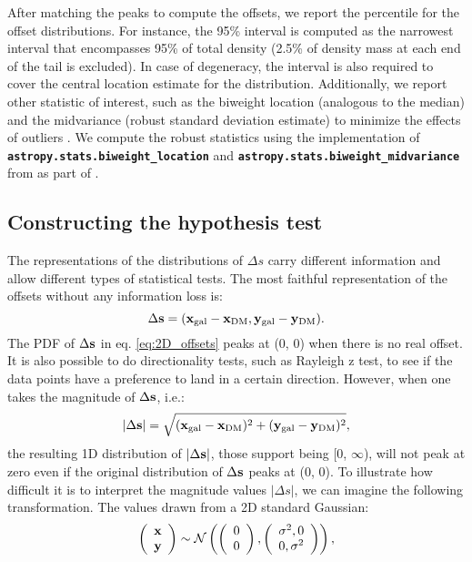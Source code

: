 After matching the peaks to compute the offsets, 
we report the percentile for the offset distributions.
For instance, the 95\% interval is computed as the narrowest interval that encompasses
95\% of total density (2.5\% of density mass at each end of the tail is
excluded). In case of degeneracy, the interval is also required to cover the 
central location estimate for the distribution.
Additionally, we report other statistic of interest, such as the biweight 
location (analogous to the median)
and the midvariance (robust standard deviation
estimate) to minimize the effects of outliers \citep{Beers90}. 
We compute the robust statistics using the 
implementation of {\bf \texttt{astropy.stats.biweight\_location}}
and {\bf \texttt{astropy.stats.biweight\_midvariance}}
from \cite{astropy} as part of {}. 

\subsection{Constructing the hypothesis test} 
The representations of the distributions of $\Delta s$ carry
different information and allow different types of statistical tests. 
The most faithful representation of the offsets without any information loss
is:
\begin{equation}
	\Delta {\bf s} = ({\bf x}_{\rm gal} - {\bf x}_{\rm DM}, 
	{\bf y}_{\rm gal} - {\bf y}_{\rm DM} ).
	\label{eq:2D_offsets}
\end{equation}
The PDF of $\Delta {\bf s}$ in eq. \ref{eq:2D_offsets} peaks at (0, 0) when
there is no real offset. It is also possible to do directionality tests,
such as Rayleigh z test, to see if the data points have a preference to land in
a certain direction.
However, when one takes the magnitude of $\Delta {\bf s}$, i.e.:
\begin{equation}
	|\Delta {\bf s}| = \sqrt{({\bf x}_{\rm gal} - {\bf x}_{\rm DM})^2 + 
	({\bf y}_{\rm gal} - {\bf y}_{\rm DM})^2},
	\label{eq:magnitude_offsets}
\end{equation}
the resulting 1D distribution of $|\Delta {\bf s}|$, 
those support being [0, $\infty$),
will not peak at zero even if the original
distribution of $\Delta {\bf s}$ peaks at (0, 0). 
To illustrate how difficult it is to interpret the magnitude values $|\Delta
s|$,  
we can imagine the following transformation.
The values drawn from a 2D standard Gaussian: 
\begin{equation}
	\left(\begin{array}{c}
			\bf{x}\\
			\bf{y}
		\end{array}
	\right) \sim \mathcal{N}\left(
	\left(
		\begin{array}{c}
			0 \\
			0
		\end{array}
	\right),
	\left(\begin{array}{cc}
		\sigma^2, 0 \\
		0, \sigma^2
	 \end{array}
	\right)
\right),
\end{equation}
